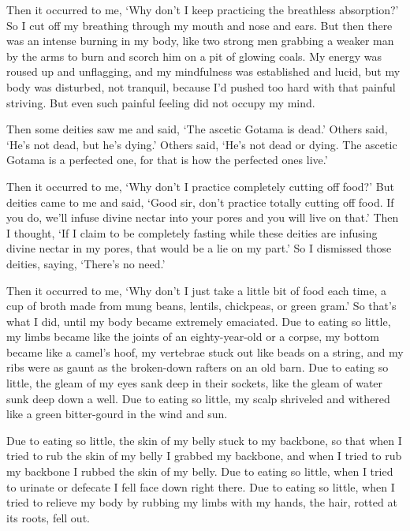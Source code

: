 \documentclass[12pt,openany]{book}%
\begin{document}
Then it occurred to me, ‘Why don’t I keep practicing the breathless absorption?’ So I cut off my breathing through my mouth and nose and ears. But then there was an intense burning in my body, like two strong men grabbing a weaker man by the arms to burn and scorch him on a pit of glowing coals. My energy was roused up and unflagging, and my mindfulness was established and lucid, but my body was disturbed, not tranquil, because I’d pushed too hard with that painful striving. But even such painful feeling did not occupy my mind. 

Then some deities saw me and said, ‘The ascetic Gotama is dead.’ Others said, ‘He’s not dead, but he’s dying.’ Others said, ‘He’s not dead or dying. The ascetic Gotama is a perfected one, for that is how the perfected ones live.’ 

Then it occurred to me, ‘Why don’t I practice completely cutting off food?’ But deities came to me and said, ‘Good sir, don’t practice totally cutting off food. If you do, we’ll infuse divine nectar into your pores and you will live on that.’ Then I thought, ‘If I claim to be completely fasting while these deities are infusing divine nectar in my pores, that would be a lie on my part.’ So I dismissed those deities, saying, ‘There’s no need.’ 

Then it occurred to me, ‘Why don’t I just take a little bit of food each time, a cup of broth made from mung beans, lentils, chickpeas, or green gram.’ So that’s what I did, until my body became extremely emaciated. Due to eating so little, my limbs became like the joints of an eighty-year-old or a corpse, my bottom became like a camel’s hoof, my vertebrae stuck out like beads on a string, and my ribs were as gaunt as the broken-down rafters on an old barn. Due to eating so little, the gleam of my eyes sank deep in their sockets, like the gleam of water sunk deep down a well. Due to eating so little, my scalp shriveled and withered like a green bitter-gourd in the wind and sun. 

Due to eating so little, the skin of my belly stuck to my backbone, so that when I tried to rub the skin of my belly I grabbed my backbone, and when I tried to rub my backbone I rubbed the skin of my belly. Due to eating so little, when I tried to urinate or defecate I fell face down right there. Due to eating so little, when I tried to relieve my body by rubbing my limbs with my hands, the hair, rotted at its roots, fell out. 
\end{document}
